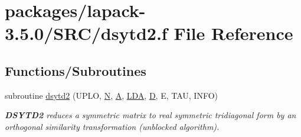 \hypertarget{dsytd2_8f}{}\section{packages/lapack-\/3.5.0/\+S\+R\+C/dsytd2.f File Reference}
\label{dsytd2_8f}
\subsection*{Functions/\+Subroutines}
\begin{DoxyCompactItemize}
\item 
subroutine \hyperlink{group__doubleSYcomputational_ga5ce2d4703eeccf51cc89171b375c796f}{dsytd2} (U\+P\+L\+O, \hyperlink{polmisc_8c_a0240ac851181b84ac374872dc5434ee4}{N}, \hyperlink{classA}{A}, \hyperlink{example__user_8c_ae946da542ce0db94dced19b2ecefd1aa}{L\+D\+A}, \hyperlink{odrpack_8h_a7dae6ea403d00f3687f24a874e67d139}{D}, E, T\+A\+U, I\+N\+F\+O)
\begin{DoxyCompactList}\small\item\em {\bfseries D\+S\+Y\+T\+D2} reduces a symmetric matrix to real symmetric tridiagonal form by an orthogonal similarity transformation (unblocked algorithm). \end{DoxyCompactList}\end{DoxyCompactItemize}
